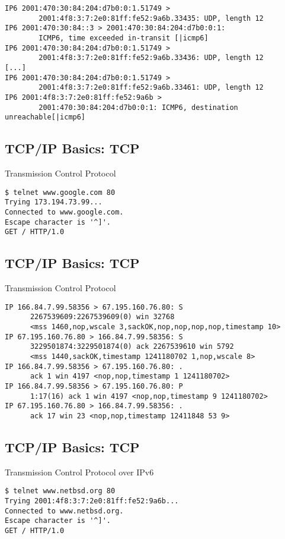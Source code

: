 \documentclass[xga]{xdvislides}
\begin{document}
\begin{verbatim}
IP6 2001:470:30:84:204:d7b0:0:1.51749 >
        2001:4f8:3:7:2e0:81ff:fe52:9a6b.33435: UDP, length 12
IP6 2001:470:30:84::3 > 2001:470:30:84:204:d7b0:0:1:
        ICMP6, time exceeded in-transit [|icmp6]
IP6 2001:470:30:84:204:d7b0:0:1.51749 >
        2001:4f8:3:7:2e0:81ff:fe52:9a6b.33436: UDP, length 12
[...]
IP6 2001:470:30:84:204:d7b0:0:1.51749 >
        2001:4f8:3:7:2e0:81ff:fe52:9a6b.33461: UDP, length 12
IP6 2001:4f8:3:7:2e0:81ff:fe52:9a6b >
        2001:470:30:84:204:d7b0:0:1: ICMP6, destination unreachable[|icmp6]
\end{verbatim}

\subsection{TCP/IP Basics: TCP}
\begin{center}
Transmission Control Protocol
\end{center}
\vspace{.2in}
\begin{verbatim}
$ telnet www.google.com 80
Trying 173.194.73.99...
Connected to www.google.com.
Escape character is '^]'.
GET / HTTP/1.0

\end{verbatim}

\subsection{TCP/IP Basics: TCP}
\begin{center}
Transmission Control Protocol
\end{center}
\vspace{.2in}
\begin{verbatim}
IP 166.84.7.99.58356 > 67.195.160.76.80: S
      2267539609:2267539609(0) win 32768
      <mss 1460,nop,wscale 3,sackOK,nop,nop,nop,nop,timestamp 10>
IP 67.195.160.76.80 > 166.84.7.99.58356: S
      3229501874:3229501874(0) ack 2267539610 win 5792
      <mss 1440,sackOK,timestamp 1241180702 1,nop,wscale 8>
IP 166.84.7.99.58356 > 67.195.160.76.80: .
      ack 1 win 4197 <nop,nop,timestamp 1 1241180702>
IP 166.84.7.99.58356 > 67.195.160.76.80: P
      1:17(16) ack 1 win 4197 <nop,nop,timestamp 9 1241180702>
IP 67.195.160.76.80 > 166.84.7.99.58356: .
      ack 17 win 23 <nop,nop,timestamp 12411848 53 9>
\end{verbatim}

\subsection{TCP/IP Basics: TCP}
\begin{center}
Transmission Control Protocol over IPv6
\end{center}
\vspace{.2in}
\begin{verbatim}
$ telnet www.netbsd.org 80
Trying 2001:4f8:3:7:2e0:81ff:fe52:9a6b...
Connected to www.netbsd.org.
Escape character is '^]'.
GET / HTTP/1.0


\end{verbatim}
\end{document}

